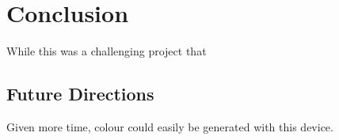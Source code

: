 \section{Conclusion}

While this was a challenging project that

\subsection{Future Directions}

Given more time, colour could easily be generated with this device.
